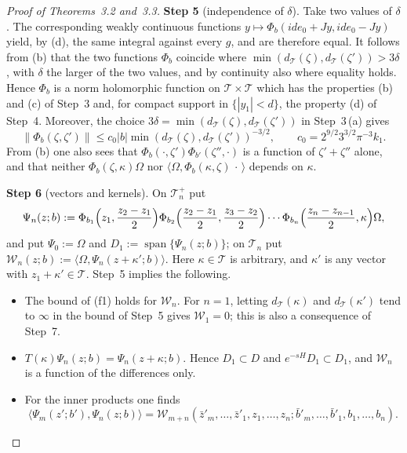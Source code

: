 \documentclass[11pt,letterpaper,reqno]{amsart}
\theoremstyle{definition}
\begin{document}
\begin{proof}[Proof of Theorems~3.2 and~3.3]
\textbf{Step 5} (independence of $\delta$).
Take two values of $\delta$.
The corresponding weakly continuous functions $y\mapsto\Phi_b(ide_0+Jy,ide_0-Jy)$ yield, by (d), the same integral against every $g$, and are therefore equal.
It follows from (b) that the two functions $\Phi_b$ coincide where $\min(d_{\mathcal T}(\zeta),d_{\mathcal T}(\zeta'))>3\delta$, with $\delta$ the larger of the two values, and by continuity also where equality holds.
Hence $\Phi_b$ is a norm holomorphic function on $\mathcal T\times\mathcal T$ which has the properties (b) and (c) of Step~3 and, for compact support in $\{|y_1|<d\}$, the property (d) of Step~4.
Moreover, the choice $3\delta=\min(d_{\mathcal T}(\zeta),d_{\mathcal T}(\zeta'))$ in Step~3\,(a) gives
\begin{equation*}
\|\Phi_b(\zeta,\zeta')\|\le c_0|b|\min(d_{\mathcal T}(\zeta),d_{\mathcal T}(\zeta'))^{-3/2},\qquad c_0=2^{9/2}3^{3/2}\pi^{-3}k_1.
\end{equation*}
From (b) one also sees that $\Phi_b(\cdot,\zeta')\Phi_{b'}(\zeta'',\cdot)$ is a function of $\zeta'+\zeta''$ alone, and that neither $\Phi_b(\zeta,\kappa)\Omega$ nor $\langle\Omega,\Phi_b(\kappa,\zeta)\,\cdot\,\rangle$ depends on $\kappa$.

\textbf{Step 6} (vectors and kernels).
On $\mathcal T_n^+$ put
\begin{equation*}
\Psi_n(z;b):=\Phi_{b_1}\Bigl(z_1,\frac{z_2-z_1}2\Bigr)\Phi_{b_2}\Bigl(\frac{z_2-z_1}2,\frac{z_3-z_2}2\Bigr)\cdots\Phi_{b_n}\Bigl(\frac{z_n-z_{n-1}}2,\kappa\Bigr)\Omega,
\end{equation*}
and put $\Psi_0:=\Omega$ and $D_1:=\operatorname{span}\{\Psi_n(z;b)\}$; on $\mathcal T_n$ put $\mathcal W_n(z;b):=\langle\Omega,\Psi_n(z+\kappa';b)\rangle$.
Here $\kappa\in\mathcal T$ is arbitrary, and $\kappa'$ is any vector with $z_1+\kappa'\in\mathcal T$.
Step~5 implies the following.
\begin{itemize}
\item[(a)] The bound of (f1) holds for $\mathcal W_n$.
For $n=1$, letting $d_{\mathcal T}(\kappa)$ and $d_{\mathcal T}(\kappa')$ tend to $\infty$ in the bound of Step~5 gives $\mathcal W_1=0$; this is also a consequence of Step~7.
\item[(b)] $T(\kappa)\Psi_n(z;b)=\Psi_n(z+\kappa;b)$.
Hence $D_1\subset D$ and $e^{-sH}D_1\subset D_1$, and $\mathcal W_n$ is a function of the differences only.
\item[(c)] For the inner products one finds
\begin{equation*}
\langle\Psi_m(z';b'),\Psi_n(z;b)\rangle=\mathcal W_{m+n}(\bar z'_m,\dots,\bar z'_1,z_1,\dots,z_n;\bar b'_m,\dots,\bar b'_1,b_1,\dots,b_n).
\end{equation*}
\end{itemize}


\end{proof}
\end{document}

